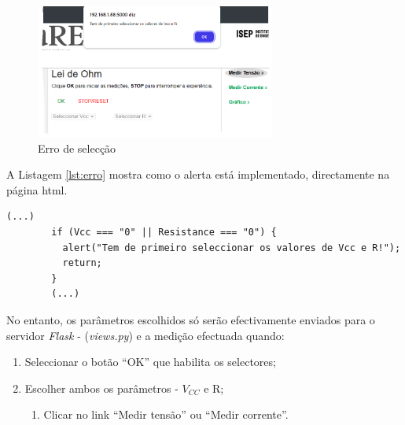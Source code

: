 \begin{figure}[hbtp]
	\centering
	\includegraphics[width=0.7\textwidth]{figures/erro_pagina.png}
	\caption{Erro de selecção}
	\label{fig:erropagina}
\end{figure}

A Listagem \ref{lst:erro} mostra como o alerta está implementado, directamente na página \acrshort{html}.

\begin{center}
	\begin{minipage}{0.7\linewidth}
		\begin{lstlisting}[language=html, caption=Erro na página \textit{ohm.html}, label=lst:erro]
		(...)
        if (Vcc === "0" || Resistance === "0") {
          alert("Tem de primeiro seleccionar os valores de Vcc e R!");
          return;
        }
		(...)
	\end{lstlisting}
	\end{minipage}
\end{center}

No entanto, os parâmetros escolhidos só serão efectivamente enviados para o servidor \textit{Flask} - (\textit{views.py}) e a medição efectuada quando:
\begin{enumerate}
	\item Seleccionar o botão ``OK'' que habilita os selectores;
	\item Escolher ambos os parâmetros - $V_{CC}$ e R;
	\begin{enumerate}
		\item Clicar no link ``Medir tensão'' ou ``Medir corrente''.
	\end{enumerate}
\end{enumerate}


